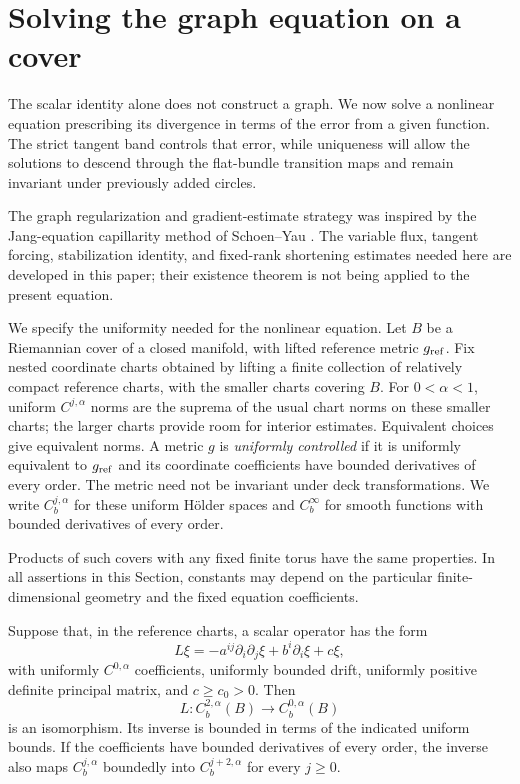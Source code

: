 \section{Solving the graph equation on a cover}
\label{sec:graph-existence}

The scalar identity alone does not construct a graph. We now solve a
nonlinear equation prescribing its divergence in terms of the error from
a given function. The strict tangent band controls that error, while
uniqueness will allow the solutions to descend through the flat-bundle
transition maps and remain invariant under previously added circles.

The graph regularization and gradient-estimate strategy was inspired by
the Jang-equation capillarity method of Schoen--Yau
\cite[Section~4, pp.~251--253]{SchoenYau1981}.  The variable flux, tangent
forcing, stabilization identity, and fixed-rank shortening estimates
needed here are developed in this paper; their existence theorem is not
being applied to the present equation.

We specify the uniformity needed for the nonlinear equation. Let $B$ be a Riemannian cover of a closed manifold, with lifted reference metric $g_{\rm ref}$. Fix nested coordinate charts obtained by lifting a finite collection of relatively compact reference charts, with the smaller charts covering $B$. For $0<\alpha<1$, uniform $C^{j,\alpha}$ norms are the suprema of the usual chart norms on these smaller charts; the larger charts provide room for interior estimates. Equivalent choices give equivalent norms. A metric $g$ is \emph{uniformly controlled} if it is uniformly equivalent to $g_{\rm ref}$ and its coordinate coefficients have bounded derivatives of every order. The metric need not be invariant under deck transformations. We write $C_b^{j,\alpha}$ for these uniform H\"older spaces and $C_b^\infty$ for smooth functions with bounded derivatives of every order.

Products of such covers with any fixed finite torus have the same properties. In all assertions in this Section, constants may depend on the particular finite-dimensional geometry and the fixed equation coefficients.

\begin{lemma}\label{lem:uniform-linear}
Suppose that, in the reference charts, a scalar operator has the form
\[
 L\xi=-a^{ij}\partial_i\partial_j\xi+b^i\partial_i\xi+c\xi,
\]
with uniformly $C^{0,\alpha}$ coefficients, uniformly bounded drift, uniformly positive definite principal matrix, and $c\ge c_0>0$. Then
\[
 L:C_b^{2,\alpha}(B)\longrightarrow C_b^{0,\alpha}(B)
\]
is an isomorphism. Its inverse is bounded in terms of the indicated uniform bounds. If the coefficients have bounded derivatives of every order, the inverse also maps $C_b^{j,\alpha}$ boundedly into $C_b^{j+2,\alpha}$ for every $j\ge0$.
\end{lemma}


